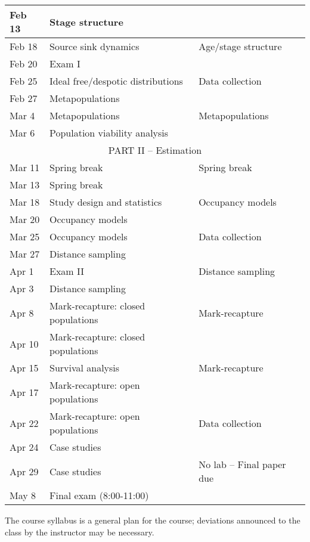 \documentclass[11pt]{article}
\begin{document}
\begin{center}
\begin{tabular}[c]{lll}
Feb 13     & Stage structure                    &                                   \\
\hline
Feb 18     & Source sink dynamics               & Age/stage structure               \\
Feb 20     & Exam I                             &                                   \\
\hline
Feb 25     & Ideal free/despotic distributions  & Data collection                   \\
Feb 27     & Metapopulations                    &                                   \\
\hline
Mar 4      & Metapopulations                    & Metapopulations                   \\
Mar 6      & Population viability analysis      &                                   \\
\hline
           \multicolumn{3}{c}{PART II -- Estimation}                                \\
\hline
Mar 11     & Spring break                       & Spring break                      \\
Mar 13     & Spring break                       &                                   \\
\hline
Mar 18     & Study design and statistics        & Occupancy models                  \\
Mar 20     & Occupancy models                   &                                   \\
\hline
Mar 25     & Occupancy models                   & Data collection                   \\
Mar 27     & Distance sampling                  &                                   \\
\hline
Apr 1      & Exam II                            & Distance sampling                 \\
Apr 3      & Distance sampling                  &                                   \\
\hline
Apr 8      & Mark-recapture: closed populations & Mark-recapture                    \\
Apr 10     & Mark-recapture: closed populations &                                   \\
\hline
Apr 15     & Survival analysis                  & Mark-recapture                    \\
Apr 17     & Mark-recapture: open populations   &                                   \\
\hline
Apr 22     & Mark-recapture: open populations   & Data collection                   \\
Apr 24     & Case studies                       &                                   \\
\hline
Apr 29     & Case studies                       & No lab -- Final paper due         \\
\hline
May  8     & Final exam (8:00-11:00)            &                                   \\
\hline \hline
\end{tabular}
\end{center}

The course syllabus is a general plan for the course; deviations announced to the class by the instructor may be necessary.
\end{document}
